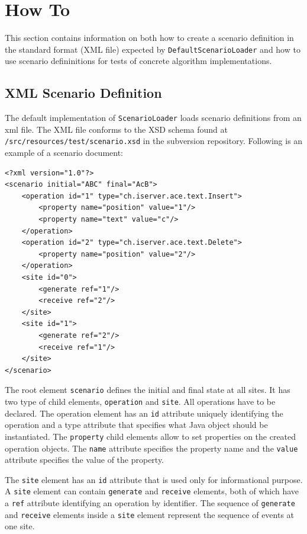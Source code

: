 \documentclass[11pt,a4paper]{article}
\begin{document}
\section{How To}
This section contains information on both how to create a scenario definition in the standard format (XML file) expected by \texttt{DefaultScenarioLoader} and how to use scenario defininitions for tests of concrete algorithm implementations.

\subsection{XML Scenario Definition}
The default implementation of \texttt{ScenarioLoader} loads scenario definitions from an xml file. The XML file conforms to the XSD schema found at \texttt{/src/resources/test/scenario.xsd} in the subversion repository. Following is an example of a scenario document:

\begin{verbatim}
<?xml version="1.0"?>
<scenario initial="ABC" final="AcB">
    <operation id="1" type="ch.iserver.ace.text.Insert">
        <property name="position" value="1"/>
        <property name="text" value="c"/>
    </operation>
    <operation id="2" type="ch.iserver.ace.text.Delete">
        <property name="position" value="2"/>
    </operation>
    <site id="0">
        <generate ref="1"/>
        <receive ref="2"/>
    </site>
    <site id="1">
        <generate ref="2"/>
        <receive ref="1"/>
    </site>
</scenario>
\end{verbatim}

The root element \texttt{scenario} defines the initial and final state at all sites. It has two type of child elements, \texttt{operation} and \texttt{site}. All operations have to be declared. The operation element has an \texttt{id} attribute uniquely identifying the operation and a type attribute that specifies what Java object should be instantiated. The \texttt{property} child elements allow to set properties on the created operation objects. The \texttt{name} attribute specifies the property name and the \texttt{value} attribute specifies the value of the property.

The \texttt{site} element has an \texttt{id} attribute that is used only for informational purpose. A \texttt{site} element can contain \texttt{generate} and \texttt{receive} elements, both of which have a \texttt{ref} attribute identifying an operation by identifier. The sequence of \texttt{generate} and \texttt{receive} elements inside a \texttt{site} element represent the sequence of events at one site. 
\end{document}
